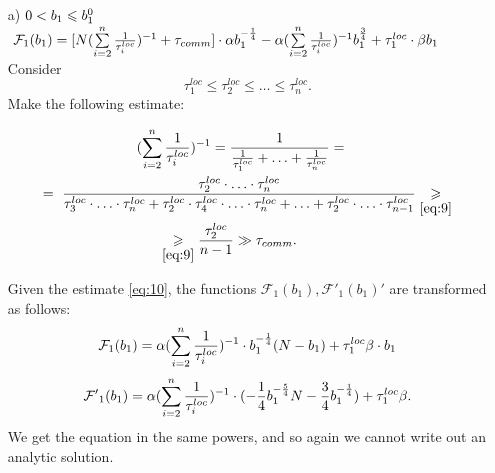 \documentclass{article}
\theoremstyle{definition}
\theoremstyle{plain}
\begin{document}
\begin{itemize}
    \item [a)] $0 < b_1 \leq b_1^0\\$
    $~\mathcal{F}_1(b_1) = [N (\sum\limits_{i = 2}^{n} \frac{1}{\tau_i^{loc}})^{-1} + \tau_{comm}]\cdot 
    \alpha  b_1^{-\frac{1}{4}} - 
    \alpha(\sum\limits_{i =
    2}^{n} \frac{1}{\tau_i^{loc}})^{-1} b_1^{\frac{3}{4}}  + \tau_1^{loc}\cdot\beta b_1\\$
    Consider
    \begin{equation}
        \label{eq:9}
        \tau_1^{loc} \leq \tau_2^{loc} \leq\ldots \leq \tau_n^{loc}.
    \end{equation}
    Make the following estimate:

    \begin{eqnarray}
        \begin{split}
        \label{eq:10}
            (\sum\limits_{i = 2}^n \frac{1}{\tau_i^{loc}})^{-1} = \frac{1}{\frac{1}{\tau_1^{loc}} + \ldots + \frac{1}{\tau_n^{loc}}} = \hspace{2.7cm}
            \\ =~ 
            \frac{\tau_2^{loc}\cdot \ldots \cdot\tau_n^{loc}}{\tau_3^{loc}\cdot \ldots \cdot\tau_n^{loc} + \tau_2^{loc}\cdot \tau_4^{loc}\cdot\ldots \cdot\tau_n^{loc} + \ldots + \tau_2^{loc}\cdot \ldots \cdot\tau_{n-1}^{loc}} 
            \underset{\eqref{eq:9}}{\geq}
            \\ \underset{\eqref{eq:9}}{\geq}\frac{\tau_2^{loc}}{n - 1} \gg \tau_{comm}.\hspace{3.9cm}
        \end{split}
    \end{eqnarray}
   
    Given the estimate \eqref{eq:10}, the functions $\mathcal{F}_1(b_1), \mathcal{F'}_1(b_1)'$ are transformed as follows:
    \begin{eqnarray}
        \notag
        \begin{split}
            \mathcal{F}_1(b_1) = \alpha(\sum\limits_{i = 2}^n \frac{1}{\tau_i^{loc}})^{-1}\cdot b_1^{-\frac{1}{4}}(N - b_1) + \tau_1^{loc}\beta\cdot b_1
        \end{split}
    \end{eqnarray}
    \begin{equation}
    \notag
        \mathcal{F'}_1 (b_1) = \alpha(\sum\limits_{i = 2}^n \frac{1}{\tau_i^{loc}})^{-1}\cdot (-\frac{1}{4}b_1^{-\frac{5}{4}}N - \frac{3}{4}b_1^{-\frac{1}{4}}) + \tau_1^{loc}\beta.
    \end{equation}
    We get the equation in the same powers, and so again we cannot write out an analytic solution.


\end{itemize}
\end{document}
